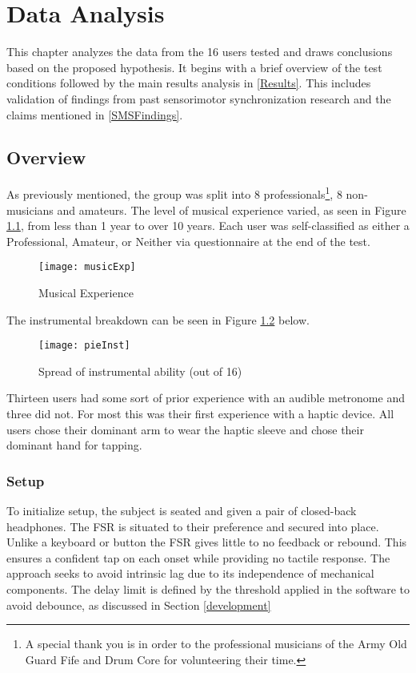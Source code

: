 \chapter{Data Analysis} \label{DataAnalysis}
This chapter analyzes the data from the 16 users tested and draws conclusions based on the proposed hypothesis. It begins with a brief overview of the test conditions followed by the main results analysis in \ref{Results}. This includes validation of findings from past sensorimotor synchronization research and the claims mentioned in \ref{SMSFindings}. 

\section{Overview}
As previously mentioned, the group was split into 8 professionals\footnote{A special thank you is in order to the professional musicians of the Army Old Guard Fife and Drum Core for volunteering their time.}, 8 non-musicians and amateurs. The level of musical experience varied, as seen in Figure \ref{fig:musicExp}, from less than 1 year to over 10 years. Each user was self-classified as either a Professional, Amateur, or Neither via questionnaire at the end of the test.
\begin{figure}[H]
    \centering
    \texttt{[image: musicExp]}
    \caption{Musical Experience}
    \label{fig:musicExp}
\end{figure}
The instrumental breakdown can be seen in Figure \ref{fig:pieInst} below.
\begin{figure}[H]
    \centering
    \texttt{[image: pieInst]}
    \caption{Spread of instrumental ability (out of 16)}
    \label{fig:pieInst}
\end{figure}
Thirteen users had some sort of prior experience with an audible metronome and three did not. For most this was their first experience with a haptic device. All users chose their dominant arm to wear the haptic sleeve and chose their dominant hand for tapping.
\subsection{Setup} \label{testSetup}
To initialize setup, the subject is seated and given a pair of closed-back headphones. The FSR is situated to their preference and secured into place. Unlike a keyboard or button the FSR gives little to no feedback or rebound. This ensures a confident tap on each onset while providing no tactile response. The approach seeks to avoid intrinsic lag due to its independence of mechanical components. The delay limit is defined by the threshold applied in the software to avoid debounce, as discussed in Section \ref{development}

